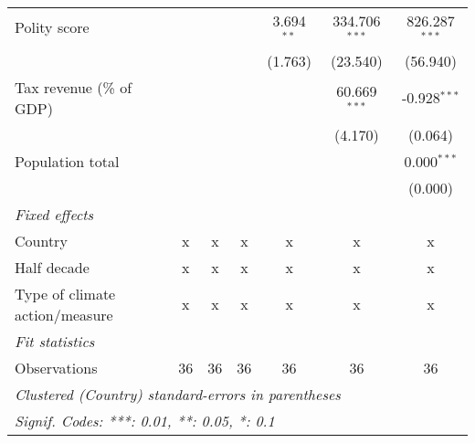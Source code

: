 \begin{tabular}{lcccccc}
   Polity score                                            &              &                &               & 3.694$^{**}$  & 334.706$^{***}$ & 826.287$^{***}$\\   
                                                           &              &                &               & (1.763)       & (23.540)        & (56.940)\\   
   Tax revenue (\% of GDP)                                 &              &                &               &               & 60.669$^{***}$  & -0.928$^{***}$\\   
                                                           &              &                &               &               & (4.170)         & (0.064)\\   
   Population total                                        &              &                &               &               &                 & 0.000$^{***}$\\   
                                                           &              &                &               &               &                 & (0.000)\\   
   \emph{Fixed effects}\\
   Country                                                 & x            & x              & x             & x             & x               & x\\  
   Half decade                                             & x            & x              & x             & x             & x               & x\\  
   Type of climate action/measure                          & x            & x              & x             & x             & x               & x\\  
   \midrule \emph{Fit statistics}\\
   Observations                                            & 36           & 36             & 36            & 36            & 36              & 36\\  
   \midrule
   \multicolumn{7}{l}{\emph{Clustered (Country) standard-errors in parentheses}}\\
   \multicolumn{7}{l}{\emph{Signif. Codes: ***: 0.01, **: 0.05, *: 0.1}}\\
\end{tabular}
\par\endgroup


